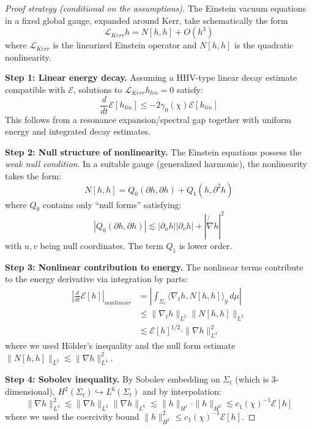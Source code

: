 \documentclass[12pt,a4paper]{article}
\newcommand{\slashed}[1]{\not{#1}}
\begin{document}
\begin{proof}[Proof strategy (conditional on the assumptions)]
The Einstein vacuum equations in a fixed global gauge, expanded around Kerr, take schematically the form
\begin{equation}
\mathcal{L}_{Kerr} h = N[h, h] + O(h^3)
\end{equation}
where $\mathcal{L}_{Kerr}$ is the linearized Einstein operator and $N[h, h]$ is the quadratic nonlinearity.

\textbf{Step 1: Linear energy decay.}
Assuming a HHV-type linear decay estimate compatible with $\mathcal{E}$, solutions to $\mathcal{L}_{Kerr} h_{lin} = 0$ satisfy:
\begin{equation}
\frac{d}{dt}\mathcal{E}[h_{lin}] \leq -2\gamma_0(\chi) \mathcal{E}[h_{lin}]
\end{equation}
This follows from a resonance expansion/spectral gap together with uniform energy and integrated decay estimates.

\textbf{Step 2: Null structure of nonlinearity.}
The Einstein equations possess the \textit{weak null condition}. In a suitable gauge (generalized harmonic), the nonlinearity takes the form:
\begin{equation}
N[h, h] = Q_0(\partial h, \partial h) + Q_1(h, \partial^2 h)
\end{equation}
where $Q_0$ contains only ``null forms'' satisfying:
\begin{equation}
|Q_0(\partial h, \partial h)| \lesssim |\partial_u h||\partial_v h| + |\slashed{\nabla} h|^2
\end{equation}
with $u, v$ being null coordinates. The term $Q_1$ is lower order.

\textbf{Step 3: Nonlinear contribution to energy.}
The nonlinear terms contribute to the energy derivative via integration by parts:
\begin{align}
\left|\frac{d}{dt}\mathcal{E}[h]\right|_{nonlinear} &= \left|\int_{\Sigma_t} \langle \nabla_t h, N[h,h] \rangle_g \, d\mu \right| \\
&\leq \|\nabla_t h\|_{L^2} \|N[h,h]\|_{L^2} \\
&\lesssim \mathcal{E}[h]^{1/2} \cdot \|\nabla h\|_{L^4}^2
\end{align}
where we used Hölder's inequality and the null form estimate $\|N[h,h]\|_{L^2} \lesssim \|\nabla h\|_{L^4}^2$.

\textbf{Step 4: Sobolev inequality.}
By Sobolev embedding on $\Sigma_t$ (which is 3-dimensional), $H^2(\Sigma_t) \hookrightarrow L^6(\Sigma_t)$ and by interpolation:
\begin{equation}
\|\nabla h\|_{L^4}^2 \lesssim \|\nabla h\|_{L^2} \|\nabla h\|_{L^6} \lesssim \|h\|_{H^1} \cdot \|h\|_{H^2} \lesssim c_1(\chi)^{-1} \mathcal{E}[h]
\end{equation}
where we used the coercivity bound $\|h\|_{H^1}^2 \leq c_1(\chi)^{-1} \mathcal{E}[h]$.


\end{proof}
\end{document}

